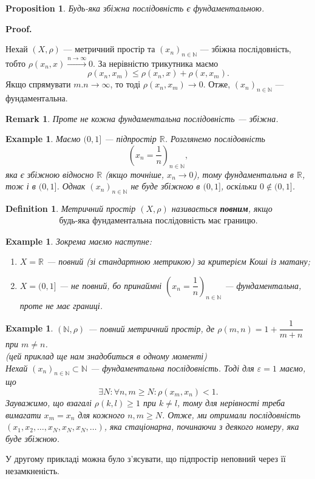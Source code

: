 \documentclass[a4paper, 10pt]{article}
\makeatletter
\theoremstyle{theoremdd}
\theoremstyle{theoremdd}
\newtheorem{definition}[theorem]{Definition}
\theoremstyle{theoremdd}
\theoremstyle{theoremdd}
\newtheorem{example}[theorem]{Example}
\theoremstyle{theoremdd}
\newtheorem{proposition}[theorem]{Proposition}
\theoremstyle{theoremdd}
\newtheorem{remark}[theorem]{Remark}
\theoremstyle{theoremdd}
\theoremstyle{theoremdd}
\renewenvironment{proof}[1][Proof.\\]{\par
\pushQED{\hfill \qed}%
\normalfont \topsep6\p@\@plus6\p@\relax
\trivlist
\item\relax
{\bfseries
#1\@addpunct{.}}\hspace\labelsep\ignorespaces
}{%
\popQED\endtrivlist\@endpefalse
}
\makeatother
\begin{document}
\begin{proposition}
Будь-яка збіжна послідовність є фундаментальною.
\end{proposition}

\begin{proof}
Нехай $(X,\rho)$ --- метричний простір та $(x_n)_{n \in \mathbb{N}}$ --- збіжна послідовність, тобто $\rho(x_n,x) \overset{n \to \infty}{\longrightarrow} 0$. За нерівністю трикутника маємо 
\[
\rho(x_n,x_m) \leq \rho(x_n,x) + \rho(x,x_m).
\]
Якщо спрямувати $m.n \to \infty$, то тоді $\rho(x_n,x_m) \to 0$. Отже, $(x_n)_{n \in \mathbb{N}}$ --- фундаментальна.
\end{proof}

\begin{remark}
Проте не кожна фундаментальна послідовність --- збіжна.
\end{remark}

\begin{example}
Маємо $(0,1]$ --- підпростір $\mathbb{R}$. Розглянемо послідовність 
\[
\left( x_n = \dfrac{1}{n}\right)_{n \in \mathbb{N}},
\]
яка є збіжною відносно $\mathbb{R}$ (якщо точніше, $x_n \to 0$), тому фундаментальна в $\mathbb{R}$, тож і в $(0,1]$. Однак $(x_n)_{n \in \mathbb{N}}$ не буде збіжною в $(0,1]$, оскільки $0 \notin (0,1]$.
\end{example}

\begin{definition}
Метричний простір $(X, \rho)$ називається \textbf{повним}, якщо 
\begin{align*}
\text{будь-яка фундаментальна послідовність має границю.}
\end{align*}
\end{definition}

\begin{example} 
Зокрема маємо наступне:
\begin{enumerate}[nosep,wide=0pt,label={\arabic*)}]
\item $X = \mathbb{R}$ --- повний (зі стандартною метрикою) за критерієм Коші із матану;
\item $X = (0,1]$ --- не повний, бо принаймні $\left(x_n = \dfrac{1}{n}\right)_{n \in \mathbb{N}}$ --- фундаментальна, проте не має границі.
\end{enumerate}
\end{example}

\begin{example}
$(\mathbb{N},\rho)$ --- повний метричний простір, де $\rho(m,n) = 1 + \dfrac{1}{m+n}$ при $m \neq n$.\\
(\textit{цей приклад ще нам знадобиться в одному моменті})
\bigskip \\
Нехай $(x_n)_{n \in \mathbb{N}} \subset \mathbb{N}$ --- фундаментальна послідовність. Тоді для $\varepsilon = 1$ маємо, що \[
\exists N: \forall n,m \geq N: \rho(x_m,x_n) < 1.
\]
Зауважимо, що взагалі $\rho(k,l) \geq 1$ при $k \neq l$, тому для нерівності треба вимагати $x_m = x_n$ для кожного $n,m \geq N$. Отже, ми отримали послідовність $(x_1,x_2,\dots,x_N,x_N,x_N,\dots)$, яка стаціонарна, починаючи з деякого номеру, яка буде збіжною.
\end{example}
\noindent
У другому прикладі можна було з'ясувати, що підпростір неповний через її незамкненість.
\end{document}

